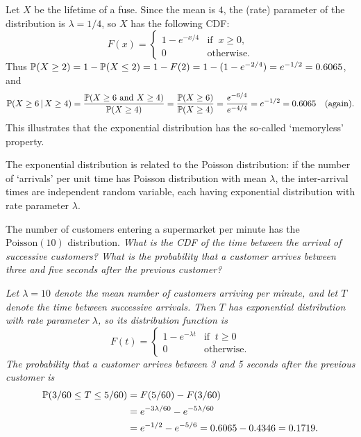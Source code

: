 \begin{solution}
Let $X$ be the lifetime of a fuse. Since the mean is $4$, the (rate) parameter of the distribution is $\lambda=1/4$, so $X$ has the following CDF: 
\[
F(x) = \begin{cases}
	1 - e^{-x/4} 	& \text{if }\ x\geq 0, \\
	0				& \text{otherwise}.	
\end{cases}
\]
Thus $\mathbb{P}(X\geq 2) = 1-\mathbb{P}(X\leq 2) = 1-F(2) = 1 - (1 - e^{-2/4}) = e^{-1/2} = 0.6065$, and 
\[
\mathbb{P}(X\geq 6\,|\,X\geq 4)
	= \frac{\mathbb{P}(X\geq 6\text{ and } X\geq 4)}{\mathbb{P}(X\geq 4)} 
	= \frac{\mathbb{P}(X\geq 6)}{\mathbb{P}(X\geq 4)}
	= \frac{e^{-6/4}}{e^{-4/4}} = e^{-1/2} = 0.6065 \quad\text{(again)}.
\]
This illustrates that the exponential distribution has the so-called `memoryless' property.
\end{solution}

The exponential distribution is related to the Poisson distribution: if the number of `arrivals' per unit time has Poisson distribution with mean $\lambda$, the inter-arrival times are independent random variable, each having exponential distribution with rate parameter $\lambda$. 

\begin{example}
The number of customers entering a supermarket per minute has the $\text{Poisson}(10)$ distribution.%
\ben
\it What is the CDF of the time between the arrival of successive customers?
\it What is the probability that a customer arrives between three and five seconds after the previous customer?
\een
\end{example}

\begin{solution}
\ben
\it %
Let $\lambda=10$ denote the mean number of customers arriving per minute, and let $T$ denote the time between successive arrivals. Then $T$ has exponential distribution with rate parameter $\lambda$, so its distribution function is
\[
F(t) = \begin{cases}
	1 - e^{-\lambda t}	& \text{if }\ t \geq 0 \\
	0					& \text{otherwise.}
\end{cases}
\]
\it %
The probability that a customer arrives between 3 and 5 seconds after the previous customer is
\begin{align*}
\mathbb{P}(3/60\leq T\leq 5/60) 
	& = F(5/60) - F(3/60) \\
	& = e^{-3\lambda/60} - e^{-5\lambda/60} \\
	& = e^{-1/2} - e^{-5/6} = 0.6065 - 0.4346 = 0.1719.
\end{align*}
\een
\end{solution}

